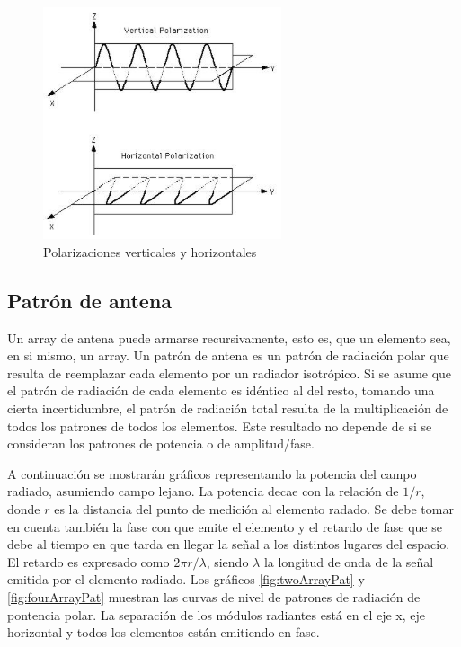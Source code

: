 \begin{figure}[H]
 \centering
 \includegraphics[width=7cm]{gfx/HAndVPolarizations.png}
 \caption{Polarizaciones verticales y horizontales}
 \label{fig:polarizations}
\end{figure}



\subsection{Patrón de antena}

Un array de antena puede armarse recursivamente, esto es, que un elemento sea, en si mismo, un array. Un patrón de antena es 
un patrón de radiación polar que resulta de reemplazar cada elemento por un radiador isotrópico. Si se asume que el patrón de
radiación de cada elemento es idéntico al del resto, tomando una cierta incertidumbre, el patrón de radiación total resulta de
la multiplicación de todos los patrones de todos los elementos. Este resultado no depende de si se consideran los patrones de
potencia o de amplitud/fase.

A continuación se mostrarán gráficos representando la potencia del campo radiado, asumiendo campo lejano. La potencia decae 
con la relación de $1/r$, donde $r$ es la distancia del punto de medición al elemento radado. Se debe tomar en cuenta también
la fase con que emite el elemento y el retardo de fase que se debe al tiempo en que tarda en llegar la señal a los distintos 
lugares del espacio. El retardo es expresado como $2\pi r/\lambda$, siendo $\lambda$ la longitud de onda de la señal emitida 
por el elemento radiado. Los gráficos \ref{fig:twoArrayPat} y \ref{fig:fourArrayPat} muestran las curvas de nivel de patrones 
de radiación de pontencia polar. La separación de los módulos radiantes está en el eje x, eje horizontal y todos los elementos
están emitiendo en fase.


